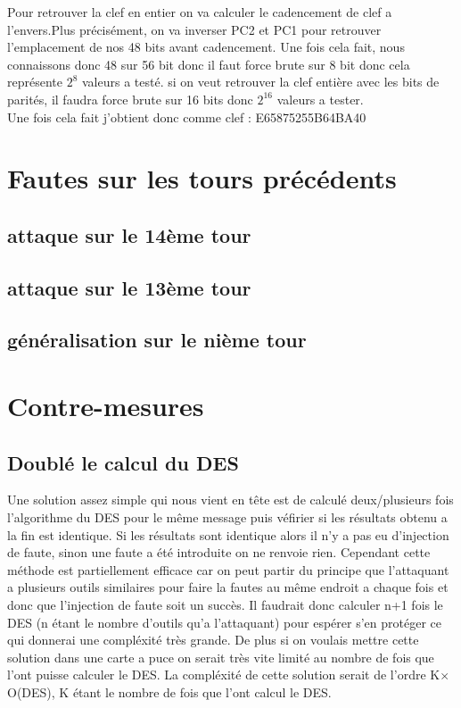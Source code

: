\documentclass[a4paper]{report}
\begin{document}
			Pour retrouver la clef en entier on va calculer le cadencement de clef a l'envers.Plus précisément, on va inverser PC2 et PC1 pour retrouver l'emplacement de nos 48 bits avant cadencement. Une fois cela fait, nous connaissons donc 48 sur 56 bit donc il faut force brute sur 8 bit donc cela représente $2^{8}$ valeurs a testé. si on veut retrouver la clef entière avec les bits de parités, il faudra force brute sur 16 bits donc $2^{16}$ valeurs a tester.\\
			Une fois cela fait j'obtient donc comme clef : E65875255B64BA40
		
		\chapter{Fautes sur les tours précédents}
			\section{attaque sur le 14ème tour}
			\section{attaque sur le 13ème tour}
			\section{généralisation sur le nième tour}
		
		\chapter{Contre-mesures}
			\section{Doublé le calcul du DES}
				Une solution assez simple qui nous vient en tête est de calculé deux/plusieurs fois l'algorithme du DES pour le même message puis véfirier si les résultats obtenu a la fin est
				identique.
				Si les résultats sont identique alors il n'y a pas eu d'injection de faute, sinon une faute a été introduite on ne renvoie rien.
				Cependant cette méthode est partiellement efficace car on peut partir du principe que l'attaquant a plusieurs outils similaires pour faire la fautes au même endroit a chaque fois et 
				donc que l'injection de faute soit un succès. 
				Il faudrait donc calculer n+1 fois le DES (n étant le nombre d'outils qu'a l'attaquant) pour espérer s'en protéger ce qui donnerai une compléxité très grande. 
				De plus si on voulais mettre cette solution dans une carte a puce on serait très vite limité au nombre de fois que l'ont puisse calculer le DES.
				La compléxité de cette solution serait de l'ordre K$\times$O(DES), K étant le nombre de fois que l'ont calcul le DES.
			
\end{document}

